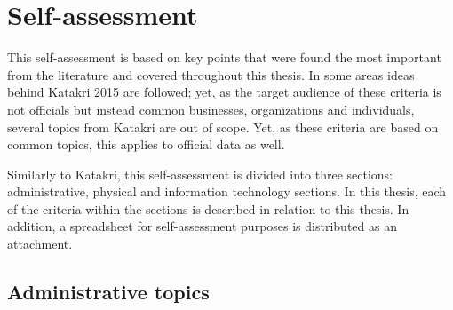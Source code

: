 \documentclass{article}
\begin{document}
\section{Self-assessment}
This self-assessment is based on key points that were found the most important from the literature and covered throughout this thesis. In some areas ideas behind Katakri 2015 are followed; yet, as the target audience of these criteria is not officials but instead common businesses, organizations and individuals, several topics from Katakri are out of scope. Yet, as these criteria are based on common topics, this applies to official data as well.
\par
Similarly to Katakri, this self-assessment is divided into three sections: administrative, physical and information technology sections. In this thesis, each of the criteria within the sections is described in relation to this thesis. In addition, a spreadsheet for self-assessment purposes is distributed as an attachment.
\subsection{Administrative topics}
\end{document}
